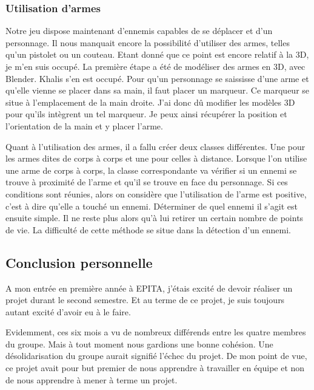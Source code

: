 \documentclass[12pt]{article}
\begin{document}
\subsubsection{Utilisation d'armes}

Notre jeu dispose maintenant d'ennemis capables de se déplacer et d'un personnage. Il nous manquait encore la possibilité d'utiliser des armes, telles qu'un pistolet ou un couteau. Etant donné que ce point est encore relatif à la 3D, je m'en suis occupé. La première étape a été de modéliser des armes en 3D, avec Blender. Khalis s'en est occupé. Pour qu'un personnage se saississe d'une arme et qu'elle vienne se placer dans sa main, il faut placer un marqueur. Ce marqueur se situe à l'emplacement de la main droite. J'ai donc dû modifier les modèles 3D pour qu'ils intègrent un tel marqueur. Je peux ainsi récupérer la position et l'orientation de la main et y placer l'arme.

Quant à l'utilisation des armes, il a fallu créer deux classes différentes. Une pour les armes dites de corps à corps et une pour celles à distance. Lorsque l'on utilise une arme de corps à corps, la classe correspondante va vérifier si un ennemi se trouve à proximité de l'arme et qu'il se trouve en face du personnage. Si ces conditions sont réunies, alors on considère que l'utilisation de l'arme est positive, c'est à dire qu'elle a touché un ennemi. Déterminer de quel ennemi il s'agit est ensuite simple. Il ne reste plus alors qu'à lui retirer un certain nombre de points de vie. La difficulté de cette méthode se situe dans la détection d'un ennemi. 




\newpage

\subsection{Conclusion personnelle}

A mon entrée en première année à EPITA, j'étais excité de devoir réaliser un projet durant le second semestre. Et au terme de ce projet, je suis toujours autant excité d'avoir eu à le faire. 

Evidemment, ces six mois a vu de nombreux différends entre les quatre membres du groupe. Mais à tout moment nous gardions une bonne cohésion. Une désolidarisation du groupe aurait signifié l'échec du projet. De mon point de vue, ce projet avait pour but premier de nous apprendre à travailler en équipe et non de nous apprendre à mener à terme un projet. 
\end{document}
